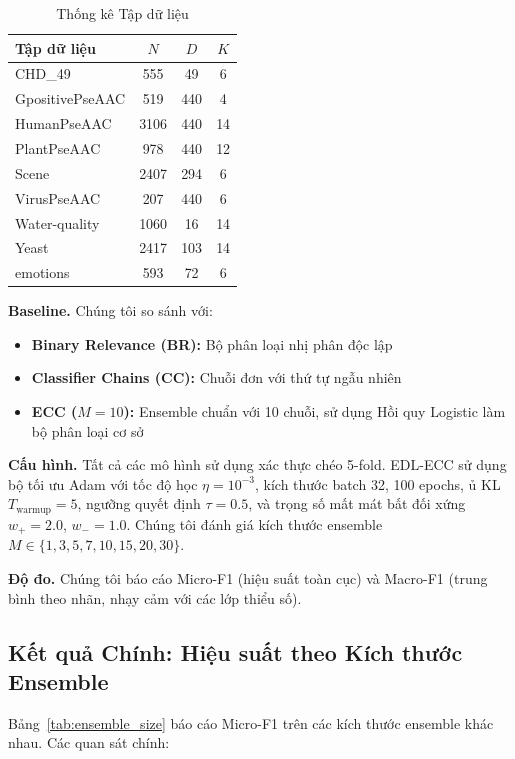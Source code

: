 \documentclass[conference]{IEEEtran}
\begin{document}
\begin{table}[t]
\centering
\caption{Thống kê Tập dữ liệu}
\label{tab:dataset_stats}
\small
\begin{tabular}{lccc}
\toprule
\textbf{Tập dữ liệu} & \textbf{$N$} & \textbf{$D$} & \textbf{$K$} \\
\midrule
CHD\_49 & 555 & 49 & 6 \\
GpositivePseAAC & 519 & 440 & 4 \\
HumanPseAAC & 3106 & 440 & 14 \\
PlantPseAAC & 978 & 440 & 12 \\
Scene & 2407 & 294 & 6 \\
VirusPseAAC & 207 & 440 & 6 \\
Water-quality & 1060 & 16 & 14 \\
Yeast & 2417 & 103 & 14 \\
emotions & 593 & 72 & 6 \\
\bottomrule
\end{tabular}
\end{table}

\textbf{Baseline.} Chúng tôi so sánh với:
\begin{itemize}
    \item \textbf{Binary Relevance (BR):} Bộ phân loại nhị phân độc lập
    \item \textbf{Classifier Chains (CC):} Chuỗi đơn với thứ tự ngẫu nhiên
    \item \textbf{ECC ($M=10$):} Ensemble chuẩn với 10 chuỗi, sử dụng Hồi quy Logistic làm bộ phân loại cơ sở
\end{itemize}

\textbf{Cấu hình.} Tất cả các mô hình sử dụng xác thực chéo 5-fold. EDL-ECC sử dụng bộ tối ưu Adam với tốc độ học $\eta = 10^{-3}$, kích thước batch 32, 100 epochs, ủ KL $T_{\text{warmup}} = 5$, ngưỡng quyết định $\tau = 0.5$, và trọng số mất mát bất đối xứng $w_+ = 2.0$, $w_- = 1.0$. Chúng tôi đánh giá kích thước ensemble $M \in \{1, 3, 5, 7, 10, 15, 20, 30\}$.

\textbf{Độ đo.} Chúng tôi báo cáo Micro-F1 (hiệu suất toàn cục) và Macro-F1 (trung bình theo nhãn, nhạy cảm với các lớp thiểu số).

\subsection{Kết quả Chính: Hiệu suất theo Kích thước Ensemble}

Bảng~\ref{tab:ensemble_size} báo cáo Micro-F1 trên các kích thước ensemble khác nhau. Các quan sát chính:
\end{document}
